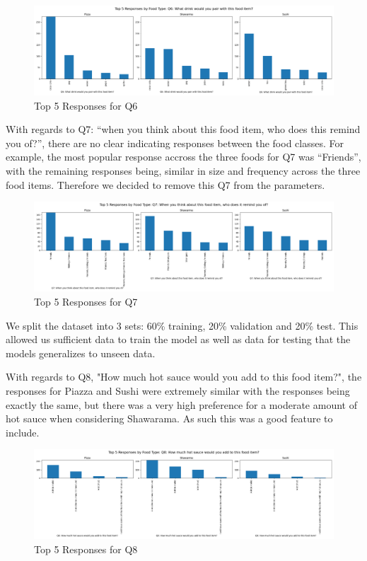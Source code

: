 \begin{figure}[h]
    \centerline{\includegraphics[width=\columnwidth]{data/top_5_responses_Q6.png}}
    \caption{Top 5 Responses for Q6}
    \label{f:hist_q2}
\end{figure}

With regards to Q7: “when you think about this food item, who does this remind you of?”, there are no clear indicating responses
between the food classes. For example, the most popular response accross the three foods for Q7 was “Friends”, with the remaining
responses being, similar in size and frequency across the three food items. Therefore we decided to remove this Q7 from the parameters. 

\begin{figure}[h]
    \centerline{\includegraphics[width=\columnwidth]{data/top_5_responses_Q7.png}}
    \caption{Top 5 Responses for Q7}
    \label{f:hist_q2}
\end{figure}

We split the dataset into 3 sets: 60\% training, 20\% validation and 20\% test. This allowed us sufficient data to train the model as well as data for testing that the models generalizes to unseen data.

With regards to Q8, "How much hot sauce would you add to this food item?", the responses for Piazza and Sushi were extremely similar with the responses being exactly the same, but there was a very
high preference for a moderate amount of hot sauce when considering Shawarama. As such this was a good feature to include.


\begin{figure}[h]
    \centerline{\includegraphics[width=\columnwidth]{data/top_5_responses_Q8.png}}
    \caption{Top 5 Responses for Q8}
    \label{f:hist_q2}
\end{figure}




